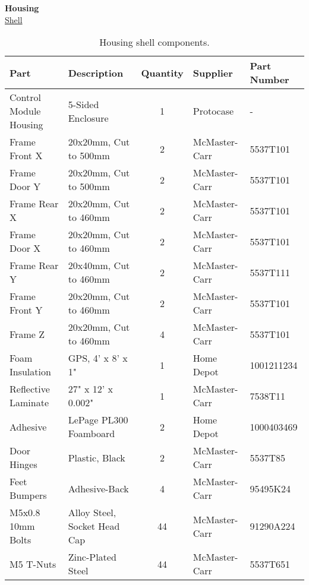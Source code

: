 \clearpage

\textbf{Housing}\\
\uline{Shell}
\begin{table}[!ht]
    \centering
    \begin{tabular}{|l|l|c|l|l|}
    \hline
        Part                    & Description                   & Quantity  & Supplier      & Part Number   \\ \hline
        Control Module Housing  & 5-Sided Enclosure             & 1         & Protocase     & -             \\ \hline
        Frame Front X           & 20x20mm, Cut to 500mm         & 2         & McMaster-Carr & 5537T101      \\ \hline
        Frame Door Y            & 20x20mm, Cut to 500mm         & 2         & McMaster-Carr & 5537T101      \\ \hline
        Frame Rear X            & 20x20mm, Cut to 460mm         & 2         & McMaster-Carr & 5537T101      \\ \hline
        Frame Door X            & 20x20mm, Cut to 460mm         & 2         & McMaster-Carr & 5537T101      \\ \hline
        Frame Rear Y            & 20x40mm, Cut to 460mm         & 2         & McMaster-Carr & 5537T111      \\ \hline
        Frame Front Y           & 20x20mm, Cut to 460mm         & 2         & McMaster-Carr & 5537T101      \\ \hline
        Frame Z                 & 20x20mm, Cut to 460mm         & 4         & McMaster-Carr & 5537T101      \\ \hline
        Foam Insulation         & GPS, 4' x 8' x 1"             & 1         & Home Depot    & 1001211234    \\ \hline
        Reflective Laminate     & 27" x 12' x 0.002"            & 1         & McMaster-Carr & 7538T11       \\ \hline
        Adhesive                & LePage PL300 Foamboard        & 2         & Home Depot    & 1000403469    \\ \hline
        Door Hinges             & Plastic, Black                & 2         & McMaster-Carr & 5537T85       \\ \hline
        Feet Bumpers            & Adhesive-Back                 & 4         & McMaster-Carr & 95495K24      \\ \hline
        M5x0.8 10mm Bolts       & Alloy Steel, Socket Head Cap  & 44        & McMaster-Carr & 91290A224     \\ \hline
        M5 T-Nuts               & Zinc-Plated Steel             & 44        & McMaster-Carr & 5537T651      \\ \hline
    \end{tabular}
    \caption{Housing shell components.}
    \label{tab:housing_shell_parts}
\end{table}

